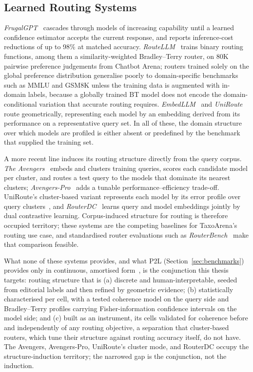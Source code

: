 \subsection*{Learned Routing Systems}

\textit{FrugalGPT}~\parencite{chen2023frugalgpt} cascades through
models of increasing capability until a learned confidence estimator
accepts the current response, and reports inference-cost reductions
of up to 98\% at matched accuracy.
\textit{RouteLLM}~\parencite{ong2024routellm} trains binary routing
functions, among them a similarity-weighted Bradley--Terry router, on
80K pairwise preference judgements from Chatbot Arena; routers
trained solely on the global preference distribution generalise
poorly to domain-specific benchmarks such as MMLU and GSM8K unless
the training data is augmented with in-domain labels, because a
globally trained BT model does not encode the domain-conditional
variation that accurate routing requires.
\textit{EmbedLLM}~\parencite{zhuang2024embedllm} and
\textit{UniRoute}~\parencite{jitkrittum2025uniroute} route
geometrically, representing each model by an embedding derived from
its performance on a representative query set. In all of these, the
domain structure over which models are profiled is either absent or
predefined by the benchmark that supplied the training set.

A more recent line induces its routing structure directly from the
query corpus. \textit{The Avengers}~\parencite{zhang2025avengers}
embeds and clusters training queries, scores each candidate model per
cluster, and routes a test query to the models that dominate its
nearest clusters;
\textit{Avengers-Pro}~\parencite{zhang2025avengerspro} adds a tunable
performance--efficiency trade-off. UniRoute's cluster-based variant
represents each model by its error profile over query
clusters~\parencite{jitkrittum2025uniroute}, and
\textit{RouterDC}~\parencite{chen2024routerdc} learns query and model
embeddings jointly by dual contrastive learning. Corpus-induced
structure for routing is therefore occupied territory; these systems
are the competing baselines for TaxoArena's routing use case, and
standardised router evaluations such as
\textit{RouterBench}~\parencite{hu2024routerbench} make that
comparison feasible.

What none of these systems provides, and what P2L
(Section~\ref{sec:benchmarks}) provides only in continuous, amortised
form~\parencite{frick2025p2l}, is the conjunction this thesis
targets: routing structure that is (a) discrete and
human-interpretable, seeded from editorial labels and then refined by
geometric evidence; (b) statistically characterised per cell, with a
tested coherence model on the query side and Bradley--Terry profiles
carrying Fisher-information confidence intervals on the model side;
and (c) built as an instrument, its cells validated for coherence
before and independently of any routing objective, a separation that
cluster-based routers, which tune their structure against routing
accuracy itself, do not have. The Avengers, Avengers-Pro, UniRoute's
cluster mode, and RouterDC occupy the structure-induction territory;
the narrowed gap is the conjunction, not the induction.

